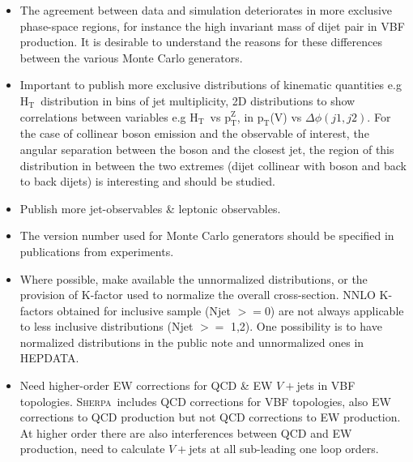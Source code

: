 \documentclass[a4paper,11pt,notoc]{article}
\newcommand{\pt}{\ensuremath{\mathrm{p_T}}}
\newcommand{\ptZ}{\ensuremath{\mathrm{p_T^{Z}}}}
\newcommand{\Ht}{\ensuremath{\mathrm{H_T}}}
\newcommand{\SHERPA}{\textsc{Sherpa}}
\begin{document}
\begin{itemize}
\item The agreement between data and simulation deteriorates in more exclusive phase-space regions, for instance the high invariant mass of dijet pair in VBF production. It is desirable to understand the reasons for these differences between the various Monte Carlo generators.
\item Important to publish more exclusive distributions of kinematic quantities e.g \Ht\ distribution in bins of jet multiplicity, 2D distributions to show correlations between variables e.g \Ht\ vs \ptZ, in \pt(V) vs $\Delta\phi(j1,j2)$. For the case of collinear boson emission and the observable of interest, the angular separation between the boson and the closest jet, the region of this distribution in between the two extremes (dijet collinear with boson and back to back dijets) is interesting and should be studied. 
\item Publish more jet-observables \& leptonic observables.
\item The version number used for Monte Carlo generators should be specified in publications from experiments.
\item Where possible, make available the unnormalized distributions, or the provision of K-factor used to normalize the overall cross-section. NNLO K-factors obtained for inclusive sample (Njet $>=$0) are not always applicable to less inclusive distributions (Njet $>=$ 1,2). One possibility is to have normalized distributions in the public note and unnormalized ones in HEPDATA.
\item Need higher-order EW corrections for QCD \& EW $V+$jets in VBF topologies. \SHERPA\ includes QCD corrections for VBF topologies, also EW corrections to QCD production but not QCD corrections to EW production. At higher order there are also interferences between QCD and EW production, need to calculate $V+$jets at all sub-leading one loop orders.  
\end{itemize}



\end{document}
